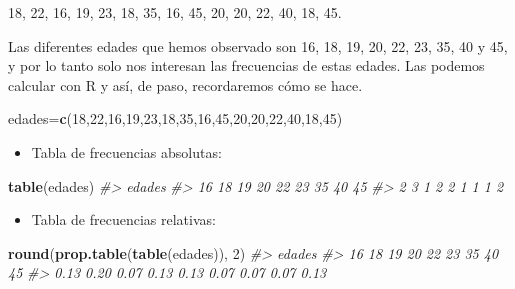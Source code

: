 \documentclass[
]{book}
\newenvironment{Shaded}{\begin{snugshade}}{\end{snugshade}}
\newcommand{\CommentTok}[1]{\textcolor[rgb]{0.56,0.35,0.01}{\textit{#1}}}
\newcommand{\DecValTok}[1]{\textcolor[rgb]{0.00,0.00,0.81}{#1}}
\newcommand{\KeywordTok}[1]{\textcolor[rgb]{0.13,0.29,0.53}{\textbf{#1}}}
\newcommand{\NormalTok}[1]{#1}
\providecommand{\tightlist}{%
  \setlength{\itemsep}{0pt}\setlength{\parskip}{0pt}}
\theoremstyle{definition}
\theoremstyle{definition}
\theoremstyle{definition}
\theoremstyle{remark}
\begin{document}
18, 22, 16, 19, 23, 18, 35, 16, 45, 20, 20, 22, 40, 18, 45.

Las diferentes edades que hemos observado son 16, 18, 19, 20, 22, 23, 35, 40 y 45, y por lo tanto solo nos interesan las frecuencias de estas edades. Las podemos calcular con R y así, de paso, recordaremos cómo se hace.

\begin{Shaded}
\begin{Highlighting}[]
\NormalTok{edades=}\KeywordTok{c}\NormalTok{(}\DecValTok{18}\NormalTok{,}\DecValTok{22}\NormalTok{,}\DecValTok{16}\NormalTok{,}\DecValTok{19}\NormalTok{,}\DecValTok{23}\NormalTok{,}\DecValTok{18}\NormalTok{,}\DecValTok{35}\NormalTok{,}\DecValTok{16}\NormalTok{,}\DecValTok{45}\NormalTok{,}\DecValTok{20}\NormalTok{,}\DecValTok{20}\NormalTok{,}\DecValTok{22}\NormalTok{,}\DecValTok{40}\NormalTok{,}\DecValTok{18}\NormalTok{,}\DecValTok{45}\NormalTok{)}
\end{Highlighting}
\end{Shaded}

\begin{itemize}
\tightlist
\item
  Tabla de frecuencias absolutas:
\end{itemize}

\begin{Shaded}
\begin{Highlighting}[]
\KeywordTok{table}\NormalTok{(edades)    }
\CommentTok{\#\textgreater{} edades}
\CommentTok{\#\textgreater{} 16 18 19 20 22 23 35 40 45 }
\CommentTok{\#\textgreater{}  2  3  1  2  2  1  1  1  2}
\end{Highlighting}
\end{Shaded}

\begin{itemize}
\tightlist
\item
  Tabla de frecuencias relativas:
\end{itemize}

\begin{Shaded}
\begin{Highlighting}[]
\KeywordTok{round}\NormalTok{(}\KeywordTok{prop.table}\NormalTok{(}\KeywordTok{table}\NormalTok{(edades)), }\DecValTok{2}\NormalTok{) }
\CommentTok{\#\textgreater{} edades}
\CommentTok{\#\textgreater{}   16   18   19   20   22   23   35   40   45 }
\CommentTok{\#\textgreater{} 0.13 0.20 0.07 0.13 0.13 0.07 0.07 0.07 0.13}
\end{Highlighting}
\end{Shaded}
\end{document}
